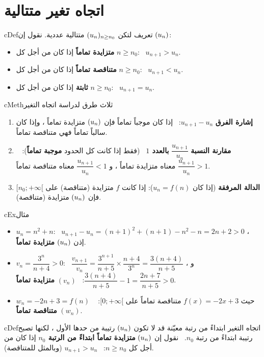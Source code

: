\documentclass[12pt,a4paper]{article}
\newenvironment{BOX}[2]{\begin{otherlanguage}{english}\begin{arbox}{#1}{#2}}{\end{arbox}\end{otherlanguage}}
\newenvironment{tarif}[1][تعريف]{\begin{BOX}{cDef}{#1}}{\end{BOX}}
\newenvironment{mithal}[1][مثال]{\begin{BOX}{cEx}{#1}}{\end{BOX}}
\newenvironment{tariqa}[1][طريقة]{\begin{BOX}{cMeth}{#1}}{\end{BOX}}
\begin{document}
\section{اتجاه تغير متتالية}
\begin{tarif}
لتكن $(u_n)_{n\ge n_0}$ متتالية عددية. نقول إن $(u_n)$:
\begin{itemize}
\item \textbf{متزايدة تماماً} إذا كان من أجل كل $n\ge n_0$: \ $u_{n+1}>u_n$.
\item \textbf{متناقصة تماماً} إذا كان من أجل كل $n\ge n_0$: \ $u_{n+1}<u_n$.
\item \textbf{ثابتة} إذا كان من أجل كل $n\ge n_0$: \ $u_{n+1}=u_n$.
\end{itemize}
\end{tarif}
\begin{tariqa}[ثلاث طرق لدراسة اتجاه التغير]
\begin{enumerate}
\item \textbf{إشارة الفرق} $u_{n+1}-u_n$: \ إذا كان موجباً تماماً فإن $(u_n)$ متزايدة تماماً ، وإذا كان سالباً تماماً فهي متناقصة تماماً.
\item \textbf{مقارنة النسبة} $\dfrac{u_{n+1}}{u_n}$ \textbf{بالعدد $1$} \ (فقط إذا كانت كل الحدود \textbf{موجبة تماماً}): \ $\dfrac{u_{n+1}}{u_n}>1$ معناه متزايدة تماماً ، و $\dfrac{u_{n+1}}{u_n}<1$ معناه متناقصة تماماً.
\item \textbf{الدالة المرفقة} (إذا كان $u_n=f(n)$): إذا كانت $f$ متزايدة (متناقصة) على $[n_0;+\infty[$ فإن $(u_n)$ متزايدة (متناقصة).
\end{enumerate}
\end{tariqa}
\begin{mithal}
\begin{itemize}
\item $u_n=n^2+n$: \ $u_{n+1}-u_n=(n+1)^2+(n+1)-n^2-n=2n+2>0$ ، إذن $(u_n)$ \textbf{متزايدة تماماً}.
\item $v_n=\dfrac{3^n}{n+4}>0$: \ $\dfrac{v_{n+1}}{v_n}=\dfrac{3^{n+1}}{n+5}\times\dfrac{n+4}{3^n}=\dfrac{3(n+4)}{n+5}$ ، و $\dfrac{3(n+4)}{n+5}-1=\dfrac{2n+7}{n+5}>0$: \ $(v_n)$ \textbf{متزايدة تماماً}.
\item $w_n=-2n+3=f(n)$ حيث $f(x)=-2x+3$ متناقصة تماماً على $[0;+\infty[$: \ $(w_n)$ \textbf{متناقصة تماماً}.
\end{itemize}
\end{mithal}
\begin{tarif}[اتجاه التغير ابتداءً من رتبة معيّنة]
قد لا تكون $(u_n)$ رتيبة من حدها الأول ، لكنها تصبح رتيبة ابتداءً من رتبة $n_0$. \ نقول إن $(u_n)$ \textbf{متزايدة تماماً ابتداءً من الرتبة $n_0$} إذا كان من أجل كل $n\ge n_0$: \ $u_{n+1}>u_n$ (وبالمثل للمتناقصة).
\end{tarif}
\end{document}
